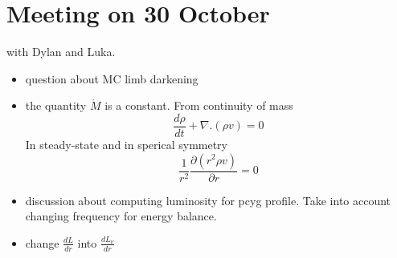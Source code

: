 \documentclass[../main/main.tex]{subfiles}
\begin{document}
\section{Meeting on 30 October}
with Dylan and Luka.
\begin{itemize}
\item question about MC limb darkening

\item the quantity $\dot{M}$ is a constant. From continuity of mass
\begin{equation}
\frac{d\rho}{dt}  + \nabla.(\rho v) = 0
\end{equation}
In steady-state and in sperical symmetry
\begin{equation}
\frac{1}{r^2}\frac{\partial (r^2 \rho v)}{\partial r} = 0
\end{equation}

\item discussion about computing luminosity for pcyg profile. Take into account changing frequency for energy balance.

\item change $\frac{dL}{dr}$ into $\frac{dL_{\nu}}{dr}$
\end{itemize}
\end{document}
